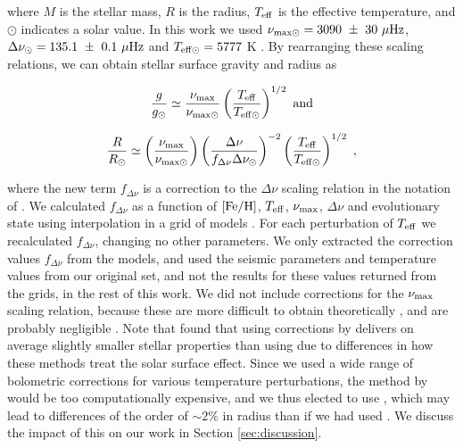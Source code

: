 \documentclass[fleqn,usenatbib]{mnras}
\newcommand{\numax}{\mbox{$\nu_{\rm max}$}\xspace}
\newcommand{\fdnu}{\mbox{$f_{\Delta\nu}$}\xspace}
\newcommand{\dnu}{\mbox{$\Delta \nu$}\xspace}
\newcommand{\teff}{\mbox{$T_{\rm eff}$}\xspace}
\newcommand{\feh}{\mbox{$\rm{[Fe/H]}$}\xspace}
\newcommand{\up}[1]{#1}
\begin{document}
\noindent where $M$ is the stellar mass, $R$ is the radius, $T_{\rm{eff}}$ is the effective temperature, and $\odot$ indicates a solar value. In this work we used $\nu_{\rm{max\odot}} = 3090\ \pm \ 30\  \mu\rm{Hz}$, $\Delta\nu_\odot = 135.1\ \pm \ 0.1\  \mu\rm{Hz}$ and $T_{\rm{eff\odot}} = 5777$ K \citep{art:huber+2011a}. By rearranging these scaling relations, we can obtain stellar surface gravity and radius as

\begin{equation}\label{eq:logg}
\frac{g}{g_\odot} \simeq \frac{\nu_{\rm{max}}}{\nu_{\rm{max}\odot}} \left(\frac{T_{\rm{eff}}}{T_{\rm{eff}\odot}}\right)^{1/2}\ \rm{and}
\end{equation}

\begin{equation}\label{eq:radius}
\frac{R}{R_\odot} \simeq \left(\frac{\nu_{\rm max}}{\nu_{\rm{max\odot}}}\right) \left(\frac{\Delta\nu}{f_{\Delta\nu}\Delta\nu_\odot}\right)^{-2} \left(\frac{T_{\rm{eff}}}{T_{\rm{eff\odot}}}\right)^{1/2}\ ,
\end{equation}

\noindent where the new term $f_{\Delta\nu}$ is a correction to the \dnu scaling relation in the notation of \cite{art:sharma+2016}. We calculated \fdnu as a function of \feh, \teff, \numax, \dnu and evolutionary state using interpolation in a grid of models \citep{art:sharma+stello2016}. \up{For each perturbation of \teff we recalculated \fdnu, changing no other parameters. We only extracted the correction values \fdnu from the models, and used the seismic parameters and temperature values from our original set, and not the results for these values returned from the grids, in the rest of this work.} We did not include corrections for the \numax scaling relation, because these are more difficult to obtain theoretically \citep{art:belkacem+2011}, and are probably negligible \citep{art:brogaard+2018}. Note that \cite{art:brogaard+2018} found that using corrections by \cite{art:rodrigues+2017} delivers on average slightly smaller stellar properties than using \cite{art:sharma+stello2016} \up{due to differences in how these methods treat the solar surface effect}. Since we used a wide range of bolometric corrections for various temperature perturbations, the method by \cite{art:rodrigues+2017} would be too computationally expensive, and we thus elected to use \cite{art:sharma+stello2016}, \up{which may lead to differences of the order of $\sim 2\%$ in radius than if we had used \cite{art:rodrigues+2017} \citep{art:white+2011}. We discuss the impact of this on our work in Section \ref{sec:discussion}.}
\end{document}
